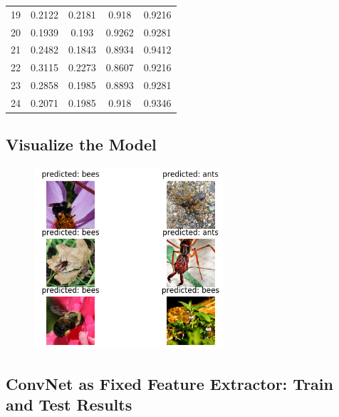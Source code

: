 \documentclass[12pt]{article}
\begin{document}
\begin{table}[h]
{\begin{tabular}{lcccc}
				19    & 0.2122     & 0.2181           & 0.918          & 0.9216              \\
				20    & 0.1939     & 0.193            & 0.9262         & 0.9281              \\
				21    & 0.2482     & 0.1843           & 0.8934         & 0.9412              \\
				22    & 0.3115     & 0.2273           & 0.8607         & 0.9216              \\
				23    & 0.2858     & 0.1985           & 0.8893         & 0.9281              \\
				24    & 0.2071     & 0.1985           & 0.918          & 0.9346              \\ \hline
			\end{tabular}
		}
		\end{table}
		
		\subsection{Visualize the Model}
		
			\begin{figure}[h]
				\centering
				\includegraphics[width=7cm]{Figure_2.png}
				\label{fig:sub1}
			\end{figure}
		\newpage
		\subsection{ConvNet as Fixed Feature Extractor: Train and Test Results}
		
\end{document}
